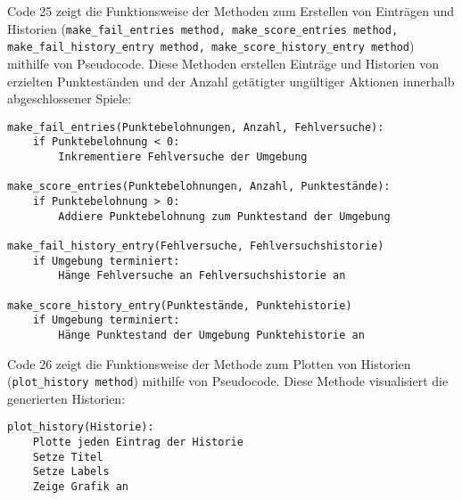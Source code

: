 \begin{minipage}{\linewidth}
Code 25 zeigt die Funktionsweise der Methoden zum Erstellen von Einträgen und Historien (\texttt{make\_fail\_entries method, make\_score\_entries method, make\_fail\_history\_entry method, make\_score\_history\_entry method}) mithilfe von Pseudocode. Diese Methoden erstellen Einträge und Historien von erzielten Punkteständen und der Anzahl getätigter ungültiger Aktionen innerhalb abgeschlossener Spiele:
\vspace{0.5cm}
\begin{lstlisting}[caption={Methoden zum Erstellen von Einträgen für Historien}]
make_fail_entries(Punktebelohnungen, Anzahl, Fehlversuche):
	if Punktebelohnung < 0:
		Inkrementiere Fehlversuche der Umgebung

make_score_entries(Punktebelohnungen, Anzahl, Punktestände):
	if Punktebelohnung > 0:
		Addiere Punktebelohnung zum Punktestand der Umgebung

make_fail_history_entry(Fehlversuche, Fehlversuchshistorie)
	if Umgebung terminiert:
		Hänge Fehlversuche an Fehlversuchshistorie an

make_score_history_entry(Punktestände, Punktehistorie)
	if Umgebung terminiert:
		Hänge Punktestand der Umgebung Punktehistorie an
\end{lstlisting}
\end{minipage}

\begin{minipage}{\linewidth}
Code 26 zeigt die Funktionsweise der Methode zum Plotten von Historien (\texttt{plot\_history method}) mithilfe von Pseudocode. Diese Methode visualisiert die generierten Historien:
\vspace{0.5cm}
\begin{lstlisting}[caption={Methode zum Plotten von Historien}]
plot_history(Historie):
	Plotte jeden Eintrag der Historie
	Setze Titel
	Setze Labels
	Zeige Grafik an
\end{lstlisting}
\end{minipage}